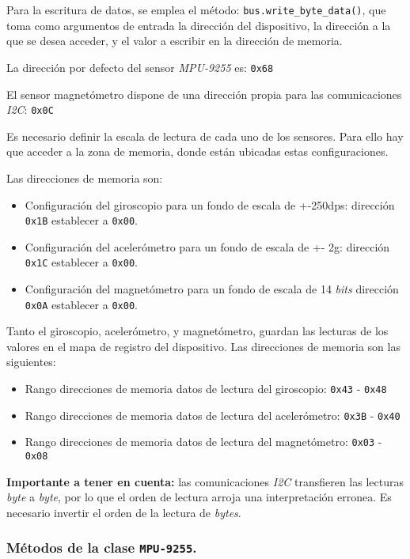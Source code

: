 Para la escritura de datos, se emplea el método: \texttt{bus.write\_byte\_data()}, que toma como argumentos de entrada la dirección del dispositivo, la dirección a la que se desea acceder, y el valor a escribir en la dirección de memoria.

La dirección por defecto del sensor \emph{MPU-9255} es: \texttt{0x68}

El sensor magnetómetro dispone de una dirección propia para las comunicaciones \emph{I2C}: \texttt{0x0C}

Es necesario definir la escala de lectura de cada uno de los sensores. Para ello hay que acceder a la zona de memoria, donde están ubicadas estas configuraciones.

Las direcciones de memoria son:
\begin{itemize}
\item Configuración del giroscopio para un fondo de escala de +-250dps: dirección \texttt{0x1B} establecer a \texttt{0x00}.
\item Configuración del acelerómetro para un fondo de escala de +- 2g: dirección \texttt{0x1C} establecer a \texttt{0x00}.
\item Configuración del magnetómetro para un fondo de escala de 14 \emph{bits} dirección \texttt{0x0A} establecer a \texttt{0x00}.
\end{itemize}

Tanto el giroscopio, acelerómetro, y magnetómetro, guardan las lecturas de los valores en el mapa de registro del dispositivo. Las direcciones de memoria son las siguientes:
\begin{itemize}
\item Rango direcciones de memoria datos de lectura del giroscopio: \texttt{0x43} - \texttt{0x48}
\item Rango direcciones de memoria datos de lectura del acelerómetro: \texttt{0x3B} - \texttt{0x40}
\item Rango direcciones de memoria datos de lectura del magnetómetro: \texttt{0x03} - \texttt{0x08}
\end{itemize}

\textbf{Importante a tener en cuenta:} las comunicaciones \emph{I2C} transfieren las lecturas \emph{byte} a \emph{byte}, por lo que el orden de lectura arroja una interpretación erronea. Es necesario invertir el orden de la lectura de \emph{bytes}. 


\subsubsection{Métodos de la clase \texttt{MPU-9255}.}

